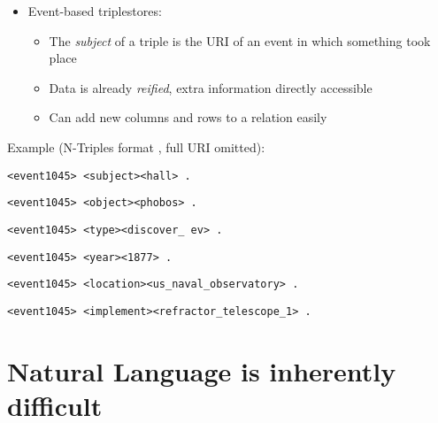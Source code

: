 \documentclass[logoontitle,tabu,supertabular,aspectratio=43]{preney-uwindsor-beamer}
\begin{document}
	\begin{frame}{\insertsection}
	\begin{itemize}
		\item Event-based triplestores:
		\begin{itemize}
			\item The {\em subject} of a triple is the URI of an event in which something took place
			\item Data is already {\em reified}, extra information directly accessible
			\item Can add new columns and rows to a relation easily
		\end{itemize}
	\end{itemize}

	Example (N-Triples format \cite{w3cntriples}, full URI omitted):

	\hspace{5em}\texttt{<event1045> <subject>\phantom{qqq}<hall> .}

	\hspace{5em}\texttt{<event1045> <object>\phantom{qqqq}<phobos> .}

	\hspace{5em}\texttt{<event1045> <type>\phantom{qqqqqq}<discover\_ ev> .}

	\hspace{5em}\texttt{<event1045> <year>\phantom{qqqqqq}<1877> .}

	\hspace{5em}\texttt{<event1045> <location>\phantom{qq}<us\_naval\_observatory> .}

	\hspace{5em}\texttt{<event1045> <implement>\phantom{q}<refractor\_telescope\_1> .}

	\end{frame}

	\section{Natural Language is inherently difficult}
\end{document}
